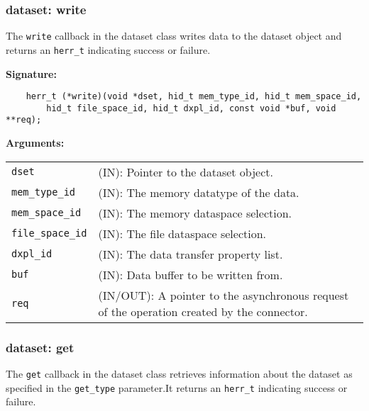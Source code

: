 \subsubsection{dataset: write}
The \texttt{write} callback in the dataset class writes data to
the dataset object and returns an \texttt{herr\_t} indicating success or
failure.\bigskip

\begin{mdframed}[style=bgbox]
\textbf{Signature:}
\begin{lstlisting}
    herr_t (*write)(void *dset, hid_t mem_type_id, hid_t mem_space_id, 
        hid_t file_space_id, hid_t dxpl_id, const void *buf, void **req);
\end{lstlisting}

\textbf{Arguments:}\\
\begin{tabular}{l p{13.5cm}}
  \texttt{dset} & (IN): Pointer to the dataset object.\\
  \texttt{mem\_type\_id} & (IN): The memory datatype of the data.\\
  \texttt{mem\_space\_id} & (IN): The memory dataspace selection.\\
  \texttt{file\_space\_id} & (IN): The file dataspace selection.\\
  \texttt{dxpl\_id} & (IN): The data transfer property list.\\
  \texttt{buf} & (IN): Data buffer to be written from.\\
  \texttt{req} & (IN/OUT): A pointer to the asynchronous request of the
  operation created by the connector.\\
\end{tabular}
\end{mdframed}

\subsubsection{dataset: get}
The \texttt{get} callback in the dataset class retrieves
information about the dataset as specified in the \texttt{get\_type}
parameter.It returns an \texttt{herr\_t} indicating success or failure.
\bigskip

